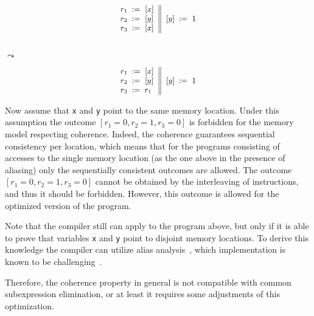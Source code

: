 \begin{minipage}{0.45\linewidth}
\begin{equation*}
\small
\inarrII{
  \readInst{}{r_1}{x}      \\
  \readInst{}{r_2}{y}      \\
  \readInst{}{r_3}{x}      \\
}{
  \writeInst{}{y}{1}       \\
}
\label{ex:coh-rr}
\end{equation*}
\end{minipage}\hfill%
\begin{minipage}{0.05\linewidth}
\Large~\\ $\leadsto$
\end{minipage}\hfill%
\begin{minipage}{0.45\linewidth}
\begin{equation*}
\small
\inarrII{
  \readInst{}{r_1}{x}      \\
  \readInst{}{r_2}{y}      \\
  \assignInst{r_3}{r_1}    \\
}{
  \writeInst{}{y}{1}       \\
}
\label{ex:coh-rr}
\end{equation*}
\end{minipage}

Now assume that \texttt{x} and \texttt{y} point to the same memory location.
Under this assumption the outcome $[r_1=0, r_2=1, r_3=0]$
is forbidden for the memory model respecting coherence.
Indeed, the coherence guarantees sequential consistency per location, 
which means that for the programs consisting of accesses 
to the single memory location 
(as the one above in the presence of aliasing) 
only the sequentially consistent outcomes are allowed.
The outcome $[r_1=0, r_2=1, r_3=0]$ cannot be obtained 
by the interleaving of instructions, and thus 
it should be forbidden.  
However, this outcome is allowed for 
the optimized version of the program. 

Note that the compiler still can apply \CSE to the program above, 
but only if it is able to prove that variables \texttt{x} and \texttt{y} 
point to disjoint memory locations. 
To derive this knowledge the compiler can utilize alias analysis~\cite{?},
which implementation is known to be challenging~\cite{?}.

Therefore, the coherence property in general is not compatible 
with common subexpression elimination, or at least 
it requires some adjustments of this optimization.

